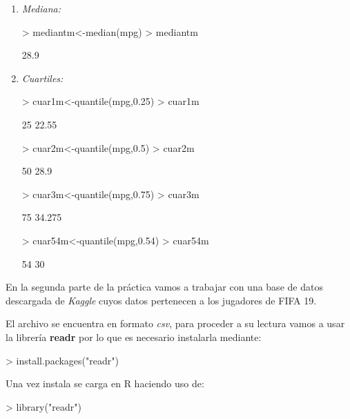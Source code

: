 \documentclass [a4paper] {article}
\begin{document}
\begin{enumerate}
\item
\textit{Mediana:}
\begin{Schunk}
\begin{Sinput}
> mediantm<-median(mpg)
> mediantm
\end{Sinput}
\begin{Soutput}
[1] 28.9
\end{Soutput}
\end{Schunk}

\item
\textit{Cuartiles:}
\begin{Schunk}
\begin{Sinput}
> cuar1m<-quantile(mpg,0.25)
> cuar1m
\end{Sinput}
\begin{Soutput}
  25%
22.55 
\end{Soutput}
\begin{Sinput}
> cuar2m<-quantile(mpg,0.5)
> cuar2m
\end{Sinput}
\begin{Soutput}
 50%
28.9 
\end{Soutput}
\begin{Sinput}
> cuar3m<-quantile(mpg,0.75)
> cuar3m
\end{Sinput}
\begin{Soutput}
   75%
34.275 
\end{Soutput}
\begin{Sinput}
> cuar54m<-quantile(mpg,0.54)
> cuar54m
\end{Sinput}
\begin{Soutput}
54%
 30 
\end{Soutput}
\end{Schunk}
\end{enumerate}

En la segunda parte de la pr\'actica vamos a trabajar con una base de datos descargada de
\textit{Kaggle} cuyos datos pertenecen a los jugadores de FIFA 19.

\bigskip
El archivo se encuentra en formato \textit{csv}, para proceder a su lectura vamos a usar la 
librer\'ia \textbf{readr} por lo que es necesario instalarla mediante:
\begin{Schunk}
\begin{Sinput}
> install.packages("readr")
\end{Sinput}
\end{Schunk}

\bigskip
Una vez instala se carga en R haciendo uso de:
\begin{Schunk}
\begin{Sinput}
> library("readr")
\end{Sinput}
\end{Schunk}
\end{document}
